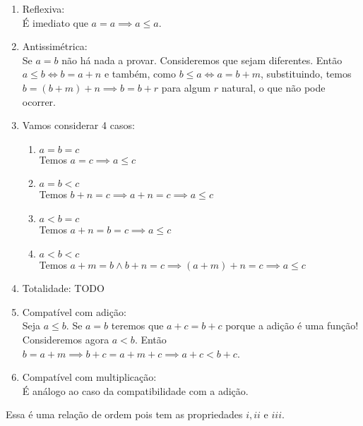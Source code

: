 \documentclass[../main.tex]{subfiles}
\begin{document}
\begin{dem}
    \begin{enumerate}[label=(\roman*)]
        \item Reflexiva: \\
            É imediato que $a = a \implies a \leq a$.
        \item Antissimétrica: \\
            Se $a=b$ não há nada a provar. Consideremos que sejam diferentes.
            Então $a \leq b \iff b = a + n$ e também, como $b \leq a \iff a = b + m$, substituindo, temos $b = (b+m) + n \implies b = b+r$ para algum $r$ natural, o que não pode ocorrer. %
        \item
            Vamos considerar 4 casos:
            \begin{enumerate}[label=(\arabic*)]
                \item $a = b = c$ \\
                    Temos $a = c \implies a \leq c$\\
                \item $a = b < c$ \\
                    Temos $ b + n = c \implies a + n = c\implies a \leq c$\\
                \item $a < b = c$ \\
                    Temos $a + n = b = c \implies a \leq c$\\
                \item $a < b < c$ \\
                    Temos $a + m = b \land b + n = c \implies ( a + m ) + n = c \implies a \leq c$
            \end{enumerate}
        \item Totalidade:
        TODO
        \item Compatível com adição: \\
        Seja $a \leq b$. Se $a = b$ teremos que $a+c = b+c$ porque a adição é uma função! 
        Consideremos agora $a < b$. Então $b = a + m \implies b+c = a+m+c \implies a+c < b+c$.
        \item Compatível com multiplicação: \\
        É análogo ao caso da compatibilidade com a adição.
     \end{enumerate}
\end{dem}

Essa é uma relação de ordem pois tem as propriedades $i, ii$ e $iii$.

\end{document}
